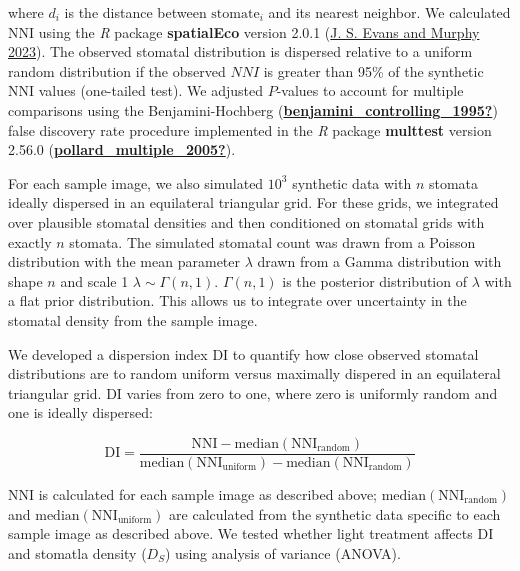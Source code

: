 \documentclass[12pt,halfline,a4paper,]{ouparticle}
\begin{document}
\noindent where \(d_i\) is the distance between \(\text{stomate}_i\) and
its nearest neighbor. We calculated \(\mathrm{NNI}\) using the \emph{R}
package \textbf{spatialEco} version 2.0.1
(\protect\hyperlink{ref-evans_spatialeco_2023}{J. S. Evans and Murphy
2023}). The observed stomatal distribution is dispersed relative to a
uniform random distribution if the observed \(NNI\) is greater than 95\%
of the synthetic \(\mathrm{NNI}\) values (one-tailed test). We adjusted
\(P\)-values to account for multiple comparisons using the
Benjamini-Hochberg
(\protect\hyperlink{ref-benjamini_controlling_1995}{\textbf{benjamini\_controlling\_1995?}})
false discovery rate procedure implemented in the \emph{R} package
\textbf{multtest} version 2.56.0
(\protect\hyperlink{ref-pollard_multiple_2005}{\textbf{pollard\_multiple\_2005?}}).

For each sample image, we also simulated \(10^3\) synthetic data with
\(n\) stomata ideally dispersed in an equilateral triangular grid. For
these grids, we integrated over plausible stomatal densities and then
conditioned on stomatal grids with exactly \(n\) stomata. The simulated
stomatal count was drawn from a Poisson distribution with the mean
parameter \(\lambda\) drawn from a Gamma distribution with shape \(n\)
and scale 1 \(\lambda \sim \Gamma(n, 1)\). \(\Gamma(n, 1)\) is the
posterior distribution of \(\lambda\) with a flat prior distribution.
This allows us to integrate over uncertainty in the stomatal density
from the sample image.

We developed a dispersion index \(\mathrm{DI}\) to quantify how close
observed stomatal distributions are to random uniform versus maximally
dispered in an equilateral triangular grid. \(\mathrm{DI}\) varies from
zero to one, where zero is uniformly random and one is ideally
dispersed:

\begin{equation}\label{eq:disp}
  \mathrm{DI} = \frac{\mathrm{NNI} - \text{median}(\mathrm{NNI_{random}})}{\text{median}(\mathrm{NNI_{uniform}}) - \text{median}(\mathrm{NNI_{random}})}
\end{equation}

\noindent \(\mathrm{NNI}\) is calculated for each sample image as
described above; \(\text{median}(\mathrm{NNI_{random}})\) and
\(\text{median}(\mathrm{NNI_{uniform}})\) are calculated from the
synthetic data specific to each sample image as described above. We
tested whether light treatment affects \(\mathrm{DI}\) and stomatla
density (\(D_S\)) using analysis of variance (ANOVA).
\end{document}
